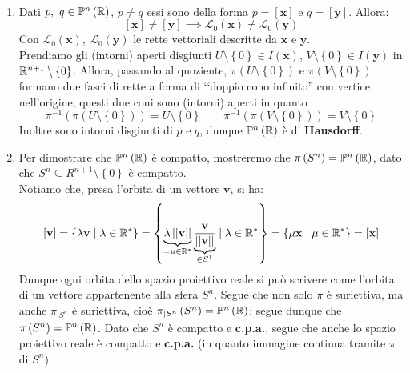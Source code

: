 \begin{proposition} \label{spazi proiettivi compatti connessi}
\end{proposition}
\begin{demonstration}~{}
\begin{enumerate}[label=\Roman*]
\item Dati $p,\ q\in\proj[n]{\realset}$, $p\neq q$ essi sono della forma $p=\left[\mathbf{x}\right]$ e $q=\left[\mathbf{y}\right]$. Allora:
\begin{equation*}
\left[\mathbf{x}\right]\neq\left[\mathbf{y}\right]\implies\mathcal{L}_0\left(\mathbf{x}\right)\neq\mathcal{L}_0\left(\mathbf{y}\right)
\end{equation*}
Con $\mathcal{L}_0\left(\mathbf{x}\right),\ \mathcal{L}_0\left(\mathbf{y}\right)$ le rette vettoriali descritte da $\mathbf{x}$ e $\mathbf{y}$.\\
Prendiamo gli (intorni) aperti disgiunti $U\setminus\left\{0\right\}\in I\left(\mathbf{x}\right)$, $V\setminus\left\{0\right\}\in I\left(\mathbf{y}\right)$ in $\mathbb{R}^{n+1}\setminus\left\{0\right\}$. Allora, passando al quoziente, $\pi\left(U\setminus\left\{0\right\}\right)$ e $\pi\left(V\setminus\left\{0\right\}\right)$ formano due fasci di rette a forma di ‘‘doppio cono infinito'' con vertice nell'origine; questi due coni sono (intorni) aperti in quanto
\begin{equation*}
\pi^{-1}\left(\pi\left(U\setminus\left\{0\right\}\right)\right)=U\setminus\left\{0\right\}\qquad\pi^{-1}\left(\pi\left(V\setminus\left\{0\right\}\right)\right)=V\setminus\left\{0\right\}
\end{equation*}
Inoltre sono intorni disgiunti di $p$ e $q$, dunque $\proj[n]{\realset}$ è di \textbf{Hausdorff}.
\item Per dimostrare che $\proj[n]{\realset}$ è compatto, mostreremo che $\pi\left(S^n\right)=\proj[n]{\realset}$, dato che $S^n\subseteq R^{n+1}\setminus\left\{0\right\}$ è compatto.\\
Notiamo che, presa l'orbita di un vettore $\mathbf{v}$, si ha:
\begin{equation*}
\left[\mathbf{v}\right]=\left\{\lambda \mathbf{v}\mid \lambda\in \mathbb{R}^{\ast}\right\}=\left\{\underbrace{\lambda \left|\left|\mathbf{v}\right|\right|}_{=\mu\in \mathbb{R}^{\ast}}\underbrace{\frac{\mathbf{v}}{\left|\left|\mathbf{v}\right|\right|}}_{\in S^1}\mid \lambda\in \mathbb{R}^{\ast}\right\}=\left\{\mu \mathbf{x}\mid \mu\in \mathbb{R}^{\ast}\right\}=\left[\mathbf{x}\right]
\end{equation*}
Dunque ogni orbita dello spazio proiettivo reale si può scrivere come l'orbita di un vettore appartenente alla sfera $S^n$. Segue che non solo $\pi$ è suriettiva, ma anche $\pi_{\mid S^n}$ è suriettiva, cioè $\pi_{\mid S^n}\left(S^n\right)=\proj[n]{\realset}$; segue dunque che $\pi\left(S^n\right)=\proj[n]{\realset}$. Dato che $S^n$ è compatto e \textbf{c.p.a.}, segue che anche lo spazio proiettivo reale è compatto e \textbf{c.p.a.} (in quanto immagine continua tramite $\pi$ di $S^n$).
\end{enumerate}
\vspace{-3mm}
\end{demonstration}